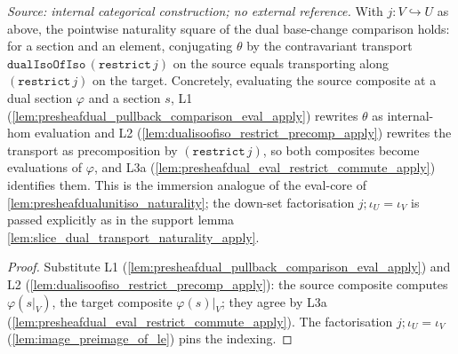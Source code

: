\begin{lemma}
  \label{lem:presheafdual_pullback_restrict_natural_apply}
  \textit{Source: internal categorical construction; no external reference.}
  With \(j : V \hookrightarrow U\) as above, the pointwise naturality square of the dual base-change
  comparison holds: for a section and an element, conjugating \(\theta\) by the contravariant
  transport \(\mathtt{dualIsoOfIso}\,(\mathtt{restrict}\,j)\) on the source equals transporting along
  \((\mathtt{restrict}\,j)\) on the target. Concretely, evaluating the source composite at a dual
  section \(\varphi\) and a section \(s\), L1 (\cref{lem:presheafdual_pullback_comparison_eval_apply})
  rewrites \(\theta\) as internal-hom evaluation and L2
  (\cref{lem:dualisoofiso_restrict_precomp_apply}) rewrites the transport as precomposition by
  \((\mathtt{restrict}\,j)\), so both composites become evaluations of \(\varphi\), and L3a
  (\cref{lem:presheafdual_eval_restrict_commute_apply}) identifies them. This is the immersion
  analogue of the eval-core of \cref{lem:presheafdualunitiso_naturality};
  the down-set factorisation \(j \mathbin{;} \iota_U = \iota_V\) is passed explicitly
  as in the support lemma \cref{lem:slice_dual_transport_naturality_apply}.
\end{lemma}
\begin{proof}
  Substitute L1 (\cref{lem:presheafdual_pullback_comparison_eval_apply}) and L2
  (\cref{lem:dualisoofiso_restrict_precomp_apply}): the source composite computes \(\varphi(s|_V)\),
  the target composite \(\varphi(s)|_V\); they agree by L3a
  (\cref{lem:presheafdual_eval_restrict_commute_apply}). The factorisation
  \(j \mathbin{;} \iota_U = \iota_V\) (\cref{lem:image_preimage_of_le}) pins the indexing.
\end{proof}

